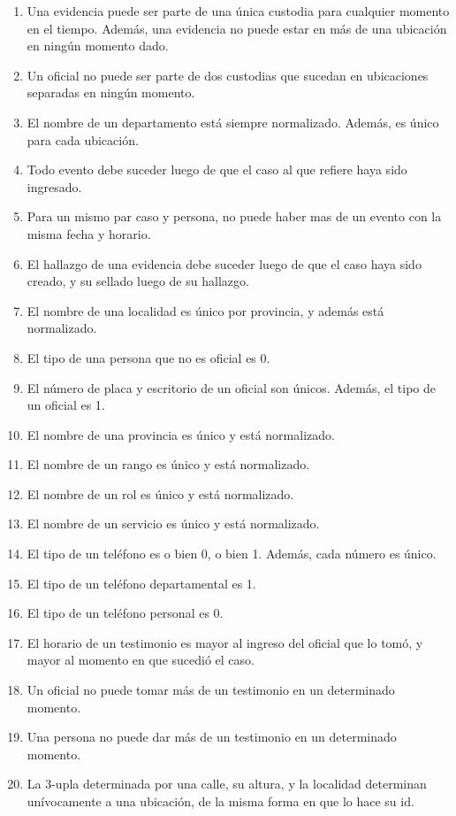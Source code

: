 \documentclass{article}
\theoremstyle{definition}
\theoremstyle{remark}
\begin{document}
\begin{enumerate}
    \item Una evidencia puede ser parte de una única custodia para cualquier momento en el tiempo. Además, una evidencia no puede estar en más de una ubicación en ningún momento dado.
    \item Un oficial no puede ser parte de dos custodias que sucedan en ubicaciones separadas en ningún momento.
    \item El nombre de un departamento está siempre normalizado. Además, es único para cada ubicación.
    \item Todo evento debe suceder luego de que el caso al que refiere haya sido ingresado.
    \item Para un mismo par caso y persona, no puede haber mas de un evento con la misma fecha y horario.
    \item El hallazgo de una evidencia debe suceder luego de que el caso haya sido creado, y su sellado luego de su hallazgo.
    \item El nombre de una localidad es único por provincia, y además está normalizado.
    \item El tipo de una persona que no es oficial es 0.
    \item El número de placa y escritorio de un oficial son únicos. Además, el tipo de un oficial es 1.
    \item El nombre de una provincia es único y está normalizado.
    \item El nombre de un rango es único y está normalizado.
    \item El nombre de un rol es único y está normalizado.
    \item El nombre de un servicio es único y está normalizado.
    \item El tipo de un teléfono es o bien 0, o bien 1. Además, cada número es único.
    \item El tipo de un teléfono departamental es 1.
    \item El tipo de un teléfono personal es 0.
    \item El horario de un testimonio es mayor al ingreso del oficial que lo tomó, y mayor al momento en que sucedió el caso.
    \item Un oficial no puede tomar más de un testimonio en un determinado momento.
    \item Una persona no puede dar más de un testimonio en un determinado momento.
    \item La 3-upla determinada por una calle, su altura, y la localidad determinan unívocamente a una ubicación, de la misma forma en que lo hace su id.
\end{enumerate}
\end{document}
